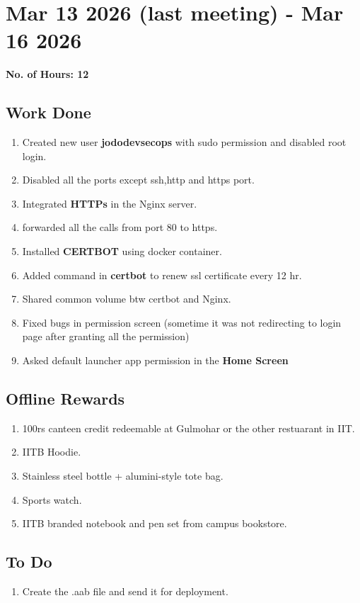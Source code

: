 \documentclass[12pt]{article}
\begin{document}
\section{Mar 13 2026 (last meeting) - Mar 16 2026}
{\bf No. of Hours: 12}
\subsection{Work Done}
\begin{enumerate}
    \item Created new user \textbf{jododevsecops} with sudo permission and disabled root login.
    \item Disabled all the ports except ssh,http and https port.
    \item Integrated \textbf{HTTPs} in the Nginx server.
    \item forwarded all the calls from port 80 to https.
    \item Installed \textbf{CERTBOT} using docker container.
    \item Added command in \textbf{certbot} to renew ssl certificate every 12 hr.
    \item Shared common volume btw certbot and Nginx.
    \item Fixed bugs in permission screen (sometime it was not redirecting to login page after granting all the permission)
    \item Asked default launcher app permission in the \textbf{Home Screen}
\end{enumerate}
\subsection{Offline Rewards}
\begin{enumerate}
    \item 100rs canteen credit redeemable at Gulmohar or the other restuarant in IIT.
    \item IITB Hoodie.
    \item Stainless steel bottle + alumini-style tote bag.
    \item Sports watch.
    \item IITB branded notebook and pen set from campus bookstore.
\end{enumerate}
\subsection{To Do}
\begin{enumerate}
    \item Create the .aab file and send it for deployment.
\end{enumerate}
\end{document}
